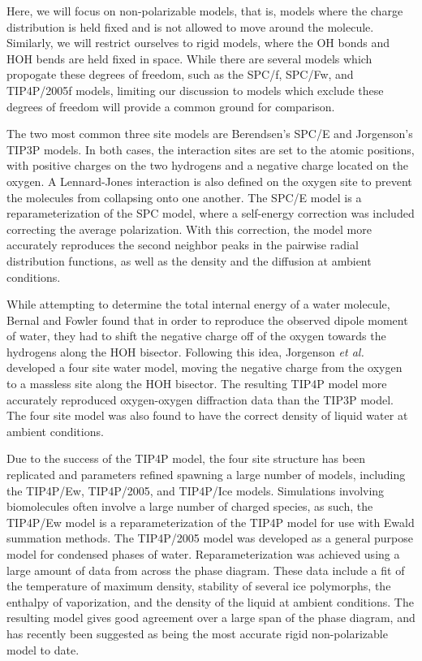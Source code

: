 Here, we will focus on non-polarizable models, that is, models where
the charge distribution is held fixed and is not allowed to move
around the molecule. Similarly, we will restrict ourselves to rigid
models, where the OH bonds and HOH bends are held fixed in
space. While there are several models which propogate these degrees of
freedom, such as the SPC/f\cite{Ferguson1995}, SPC/Fw\cite{Wu2006},
and TIP4P/2005f\cite{Gonzalez2011} models, limiting our discussion to
models which exclude these degrees of freedom will provide a common
ground for comparison. 

The two most common three site models are Berendsen's
SPC/E\cite{Berendsen1987} and Jorgenson's TIP3P\cite{Jorgenson1983}
models. In both cases, the interaction sites are set to the atomic
positions, with positive charges on the two hydrogens and a negative
charge located on the oxygen. A Lennard-Jones interaction is also
defined on the oxygen site to prevent the molecules from collapsing
onto one another. The SPC/E model is a reparameterization of the
SPC\cite{Berendsen1981} model, where a self-energy correction was
included correcting the average polarization. With this correction,
the model more accurately reproduces the second neighbor peaks in the
pairwise radial distribution functions, as well as the density and the
diffusion at ambient conditions.\cite{Berendsen1987}

While attempting to determine the total internal energy of a water
molecule, Bernal and Fowler found that in order to reproduce the
observed dipole moment of water, they had to shift the negative charge
off of the oxygen towards the hydrogens along the HOH
bisector.\cite{Bernal1933} Following this idea, Jorgenson \textit{et
  al.} developed a four site water model, moving the negative charge
from the oxygen to a massless site along the HOH bisector. The
resulting TIP4P model more accurately reproduced oxygen-oxygen
diffraction data than the TIP3P model.\cite{Jorgenson1983} The four
site model was also found to have the correct density of liquid water
at ambient conditions. 

Due to the success of the TIP4P model, the four site structure has
been replicated and parameters refined spawning a large number of
models, including the TIP4P/Ew\cite{Horn2004},
TIP4P/2005\cite{Abascal2005a}, and TIP4P/Ice\cite{Abascal2005}
models. Simulations involving biomolecules often involve a large
number of charged species, as such, the TIP4P/Ew model is a
reparameterization of the TIP4P model for use with Ewald summation
methods. The TIP4P/2005 model was developed as a general purpose model
for condensed phases of water. Reparameterization was achieved using a
large amount of data from across the phase diagram. These data
include a fit of the temperature of maximum density, stability of
several ice polymorphs, the enthalpy of vaporization, and the density
of the liquid at ambient conditions. The resulting model gives good
agreement over a large span of the phase diagram, and has recently
been suggested as being the most accurate rigid non-polarizable model
to date.\cite{Vega2011a} 

